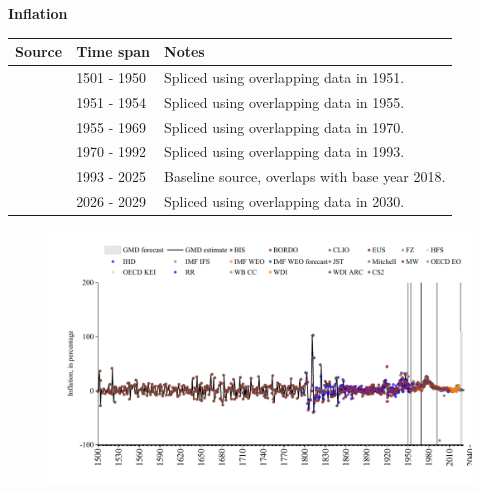\documentclass[12pt,a4paper,landscape]{article}
\begin{document}
\begin{adjustbox}{max totalsize={\paperwidth}{\paperheight},center}
\begin{minipage}[t][\textheight][t]{\textwidth}
\vspace*{0.5cm}
{}
\begin{center}
{\Large\bfseries Inflation}
\end{center}
\vspace{0.5cm}
\begin{table}[H]
\centering
\small
\begin{tabular}{|l|l|l|}
\hline
\textbf{Source} & \textbf{Time span} & \textbf{Notes} \\
\hline
\rowcolor{white}\cite{CS2_ESP}& 1501 - 1950 &Spliced using overlapping data in 1951. \\
\rowcolor{lightgray}\cite{IMF_IFS}& 1951 - 1954 &Spliced using overlapping data in 1955. \\
\rowcolor{white}\cite{BIS}& 1955 - 1969 &Spliced using overlapping data in 1970. \\
\rowcolor{lightgray}\cite{WB_CC}& 1970 - 1992 &Spliced using overlapping data in 1993. \\
\rowcolor{white}\cite{OECD_EO}& 1993 - 2025 &Baseline source, overlaps with base year 2018. \\
\rowcolor{lightgray}\cite{IMF_WEO_forecast}& 2026 - 2029 &Spliced using overlapping data in 2030. \\
\hline
\end{tabular}
\end{table}
\begin{figure}[H]
\centering
\includegraphics[width=\textwidth,height=0.6\textheight,keepaspectratio]{graphs/ESP_infl.pdf}
\end{figure}
\end{minipage}
\end{adjustbox}
\end{document}
